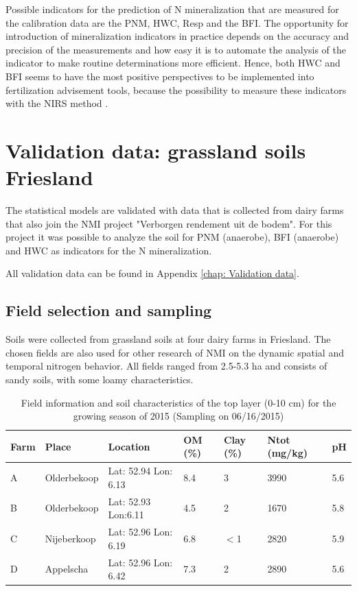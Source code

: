 \documentclass[10pt,twoside,dutch,english]{report}
\begin{document}
Possible indicators for the prediction of N mineralization that are measured for the calibration data are the PNM, HWC, Resp and the BFI. The opportunity for introduction of mineralization indicators in practice depends on the accuracy and precision of the measurements and how easy it is to automate the analysis of the indicator to make routine determinations more efficient. Hence, both HWC and BFI seems to have the most positive perspectives to be implemented into fertilization advisement tools, because the possibility to measure these indicators with the NIRS method \citep{Hanegraaf2008, Vasques2009}. 



\section{Validation data: grassland soils Friesland}
The statistical models are validated with data that is collected from dairy farms that also join the NMI project "Verborgen rendement uit de bodem". For this project it was possible to analyze the soil for PNM (anaerobe), BFI (anaerobe) and HWC   as indicators for the N mineralization. 

All validation data can be found in Appendix \autoref{chap: Validation data}.

\subsection{Field selection and sampling}
Soils were collected from grassland soils at four dairy farms in Friesland. The chosen fields are also used for other research of NMI on the dynamic spatial and temporal nitrogen behavior. All fields ranged from 2.5-5.3 ha and consists of sandy soils, with some loamy characteristics. %

\begin{table}[ht] %
	\caption{Field information and soil characteristics of the top layer (0-10 cm) for the growing season of 2015 (Sampling on 06/16/2015) }
	\footnotesize 
	\renewcommand{\arraystretch}{1.2}
	
	
	\begin{tabu} to %
		\toprule	\rowfont{\bfseries}
		Farm & Place & Location & OM (\%) & Clay (\%) & Ntot (mg/kg) & pH \\  \midrule
		A & Olderbekoop & Lat: 52.94 Lon: 6.13 & 8.4 & 3 & 3990& 5.6 \\
		B & Olderbekoop& Lat: 52.93 Lon:6.11 & 4.5& 2& 1670& 5.8\\
		C & Nijeberkoop & Lat: 52.96 Lon: 6.19 & 6.8& $<$1& 2820& 5.9\\
		D & Appelscha & Lat: 52.96 Lon: 6.42 & 7.3& 2& 2890& 5.6\\		 \bottomrule
	\end{tabu}
	
\end{table}
\end{document}
